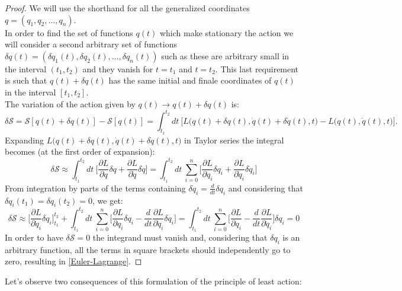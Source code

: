 \begin{proof}
    We will use the shorthand for all the generalized coordinates $q=(q_1,q_2,\dots,q_n)$.\\In order to find the set of functions $q(t)$ which make stationary the action we will consider a second arbitrary set of functions $\delta q(t)=(\delta q_1(t),\delta q_2(t),\dots,\delta q_n(t))$ such as these are arbitrary small in the interval $(t_1,t_2)$ and they vanish for $t=t_1$ and $t=t_2$. This last requirement is such that $q(t)+\delta q(t)$ has the same initial and finale coordinates of $q(t)$ in the interval $[t_1,t_2]$.\\ The variation of the action given by $q(t)\rightarrow q(t)+\delta q(t)$ is:
    \begin{equation*}
        \delta \mathcal{S}=\mathcal{S}[q(t)+\delta q(t)]-\mathcal{S}[q(t)]=\int_{t_1}^{t_2}dt\ \bigg[L\big(q(t)+\delta q(t),\dot q(t)+\delta \dot q(t),t\big)-L\big(q(t),\dot q(t),t\big)\bigg].
    \end{equation*}
    Expanding $L\big(q(t)+\delta q(t),\dot q(t)+\delta \dot q(t),t\big)$ in Taylor series the integral becomes (at the first order of expansion):
    \begin{equation*}
        \delta \mathcal{S}\approx\int_{t_1}^{t_2}dt\ \bigg[\frac{\partial L}{\partial q}\delta q+\frac{\partial L}{\partial \dot q}\delta \dot q\bigg]=\int_{t_1}^{t_2}dt\ \sum_{i=0}^{n}\bigg[\frac{\partial L}{\partial q_i}\delta q_i+\frac{\partial L}{\partial \dot q_i}\delta \dot q_i\bigg]
    \end{equation*}
    From integration by parts of the terms containing $\delta \dot q_i=\frac{d}{dt}\delta q_i$ and considering that $\delta q_i(t_1)=\delta q_i(t_2)=0$, we get:
    \begin{equation*}
        \delta \mathcal{S}\approx\bigg[\frac{\partial L}{\partial\dot q_i}\delta q_i\bigg]_{t_1}^{t_2}+\int_{t_1}^{t_2}dt\ \sum_{i=0}^{n}\bigg[\frac{\partial L}{\partial q_i}\delta q_i-\frac{d}{dt}\frac{\partial L}{\partial \dot q_i}\delta q_i\bigg]=\int_{t_1}^{t_2}dt\ \sum_{i=0}^{n}\bigg[\frac{\partial L}{\partial q_i}-\frac{d}{dt}\frac{\partial L}{\partial\dot q_i}\bigg]\delta q_i=0
    \end{equation*}
    In order to have $\delta \mathcal{S}=0$ the integrand must vanish and, considering that $\delta q_i$ is an arbitrary function, all the terms in square brackets should independently go to zero, resulting in \eqref{Euler-Lagrange}.
\end{proof}
Let's observe two consequences of this formulation of the principle of least action:
